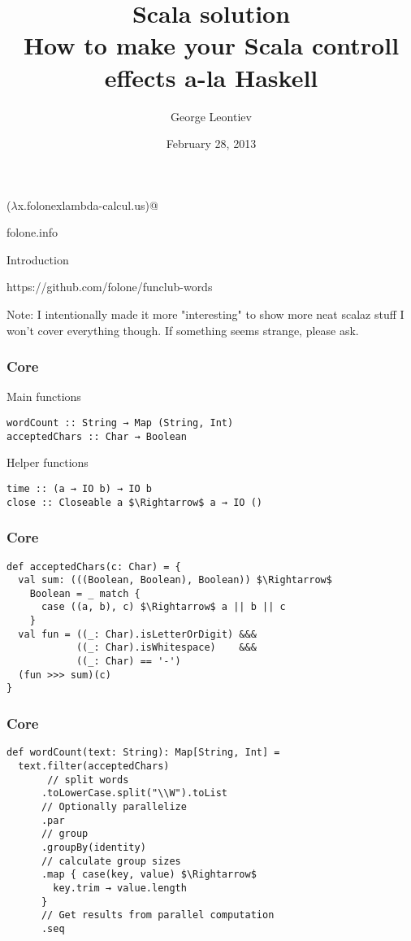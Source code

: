 \documentclass{beamer}
\title[Scala solution]{Scala solution\\How to make your Scala controll effects a-la Haskell}
\author{George Leontiev}
\institute{deltamethod GmbH}
\date{February 28, 2013}
\begin{document}
\begin{frame}
\titlepage
\centerline{($\lambda$x.folonexlambda-calcul.us)@}
\centerline{folone.info}
\end{frame}


\begin{frame}{Introduction}
  \Large \centerline{https://github.com/folone/funclub-words} \normalsize
  Note: I intentionally made it more "interesting" to show more neat scalaz stuff\newline
  I won't cover everything though. If something seems strange, please ask.
\end{frame}

\begin{frame}[fragile]
\frametitle{Core}
Main functions
\begin{lstlisting}[mathescape]
wordCount :: String → Map (String, Int)
acceptedChars :: Char → Boolean
\end{lstlisting}
Helper functions
\begin{lstlisting}[mathescape]
time :: (a → IO b) → IO b
close :: Closeable a $\Rightarrow$ a → IO ()
\end{lstlisting}
\end{frame}

\begin{frame}[fragile]
\frametitle{Core}
\begin{lstlisting}[mathescape]
def acceptedChars(c: Char) = {
  val sum: (((Boolean, Boolean), Boolean)) $\Rightarrow$
    Boolean = _ match {
      case ((a, b), c) $\Rightarrow$ a || b || c
    }
  val fun = ((_: Char).isLetterOrDigit) &&&
            ((_: Char).isWhitespace)    &&&
            ((_: Char) == '-')
  (fun >>> sum)(c)
}
\end{lstlisting}
\end{frame}

\begin{frame}[fragile]
\frametitle{Core}
\begin{lstlisting}[mathescape]
def wordCount(text: String): Map[String, Int] =
  text.filter(acceptedChars)
       // split words
      .toLowerCase.split("\\W").toList
      // Optionally parallelize
      .par
      // group
      .groupBy(identity)
      // calculate group sizes
      .map { case(key, value) $\Rightarrow$
        key.trim → value.length
      }
      // Get results from parallel computation
      .seq
\end{lstlisting}
\end{frame}
\end{document}
